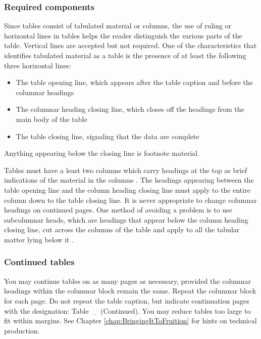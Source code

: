 \subsubsection{Required components}
\label{sec:TableRequiredComponents}

Since tables consist of tabulated material or columns, the use of
ruling or horizontal lines in tables helps the reader distinguish the
various parts of the table. Vertical lines are accepted but not
required. One of the characteristics that identifies tabulated
material as a table is the presence of at least the following three
horizontal lines:
\begin{itemize}
\item The table opening line, which appears after the table caption
  and before the columnar headings
\item The columnar heading closing line, which closes off the headings
  from the main body of the table
\item The table closing line, signaling that the data are complete
\end{itemize}
Anything appearing below the closing line is footnote material.

Tables must have a least two columns which carry headings at the top
as brief indications of the material in the columns
\cite[329]{chicago1982}. The headings appearing between the table
opening line and the column heading closing line must apply to the
entire column down to the table closing line. It is never appropriate
to change columnar headings on continued pages. One method of avoiding
a problem is to use subcolumnar heads, which are headings that appear
below the column heading closing line, cut across the columns of the
table and apply to all the tabular matter lying below it
\cite[330]{chicago1982}.

\subsubsection{Continued tables}
\label{sec:ContinuedTables}

You may continue tables on as many pages as necessary, provided the
columnar headings within the columnar block remain the same. Repeat
the columnar block for each page. Do not repeat the table caption, but
indicate continuation pages with the designation: Table
$\underline{\quad}$ (Continued). You may reduce tables too large to
fit within margins.  See Chapter \ref{chap:BringingItToFruition} for
hints on technical production.

